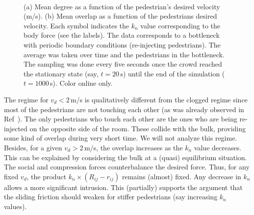 \documentclass[preprint,12pt]{elsarticle}
\begin{document}
\begin{figure}[!htbp]
\centering
{}\ 
\\
\caption[width=0.47\columnwidth]{(a) Mean degree as a function of the
pedestrian’s desired velocity (m/s). (b) Mean overlap as a function of the
pedestrians desired velocity. Each symbol indicates the $k_n$ value
corresponding to the body force (see the labels). The data corresponds to a
bottleneck with periodic boundary conditions (re-injecting pedestrians). The
average was taken over time and the pedestrians in the bottleneck. The sampling
was done every five seconds once the crowd reached the stationary state (say,
$t=20\,$s) until the end of the simulation ($t=1000\,$s). Color online only.}
\label{degree_overlap_vd}
\end{figure}

The regime for $v_d<2\,$m/s is qualitatively different from the clogged regime
since most of the  pedestrians are not touching each other (as was already
observed in Ref~\cite{dorso_2005,dorso_2011}). The only pedestrians who touch
each  other are the ones who are being re-injected on the opposite side of the
room. These collide with the bulk, providing some kind of overlap during very
short time. We will not analyze this regime.\\

Besides, for a given $v_d>2\,$m/s, the overlap increases as the $k_n$ value
decreases.  This can be explained by considering the bulk at a (quasi)
equilibrium situation.  The social and compression forces counterbalance the
desired force. Thus, for any fixed $v_d$, the product $k_n \times
(R_{ij}-r_{ij})$ remains (almost) fixed. Any decrease in $k_n$ allows a more
significant intrusion. This (partially) supports the argument that the sliding
friction should weaken for stiffer pedestrians (say increasing $k_n$ values). \\
\end{document}
